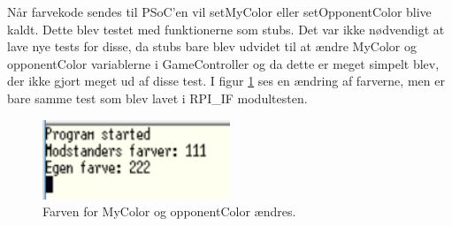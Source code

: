 \documentclass[Modultest/Modultest_main.tex]{subfiles}
\begin{document}
Når farvekode sendes til PSoC'en vil setMyColor eller setOpponentColor blive kaldt. Dette blev testet med funktionerne som stubs. Det var ikke nødvendigt at lave nye tests for disse, da stubs bare blev udvidet til at ændre MyColor og opponentColor variablerne i GameController og da dette er meget simpelt blev, der ikke gjort meget ud af disse test. I figur \ref{fig:farvekode_GameController} ses en ændring af farverne, men er bare samme test som blev lavet i RPI\_IF modultesten.
\begin{figure}[H]
    \centering
    \includegraphics[width=0.5\textwidth]{Modultest/playerside_GameController/graphics/farvekode.PNG}
    \caption{Farven for MyColor og opponentColor ændres.}
    \label{fig:farvekode_GameController}
\end{figure}
\end{document}
